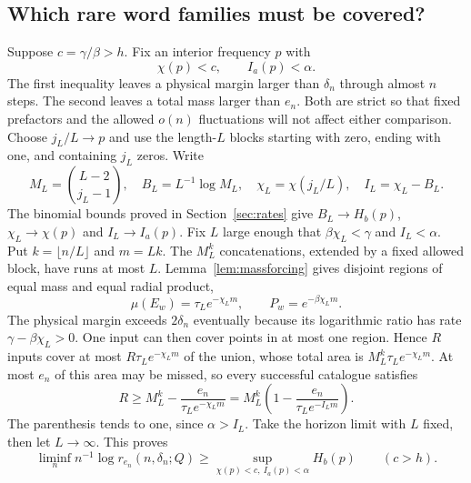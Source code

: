 \documentclass[11pt]{amsart}
\theoremstyle{definition}
\theoremstyle{remark}
\numberwithin{equation}{section}
\begin{document}
\subsection{Which rare word families must be covered?}
Suppose $c=\gamma/\beta>h$. Fix an interior frequency $p$ with
\begin{equation}\label{eq:strictprobtype}
\chi(p)<c,\qquad I_a(p)<\alpha.
\end{equation}
The first inequality leaves a physical margin larger than
$\delta_n$ through almost $n$ steps. The second leaves a total
mass larger than $e_n$. Both are strict so that fixed prefactors
and the allowed $o(n)$ fluctuations will not affect either comparison.
Choose $j_L/L\to p$ and use the length-$L$ blocks starting with
zero, ending with one, and containing $j_L$ zeros. Write
\[
M_L=\binom{L-2}{j_L-1},\quad B_L=L^{-1}\log M_L,
\quad\chi_L=\chi(j_L/L),\quad I_L=\chi_L-B_L.
\]
The binomial bounds proved in Section~\ref{sec:rates} give
$B_L\to H_b(p)$, $\chi_L\to\chi(p)$ and $I_L\to I_a(p)$.
Fix $L$ large enough that $\beta\chi_L<\gamma$ and $I_L<\alpha$.
Put $k=\lfloor n/L\rfloor$ and $m=Lk$.
The $M_L^k$ concatenations, extended by a fixed allowed block,
have runs at most $L$. Lemma~\ref{lem:massforcing} gives disjoint
regions of equal mass and equal radial product,
\[
\mu(E_w)=\tau_Le^{-\chi_Lm},\qquad P_w=e^{-\beta\chi_Lm}.
\]
The physical margin exceeds $2\delta_n$ eventually because its
logarithmic ratio has rate $\gamma-\beta\chi_L>0$.
One input can then cover points in at most one region. Hence $R$
inputs cover at most $R\tau_Le^{-\chi_Lm}$ of the union, whose
total area is $M_L^k\tau_Le^{-\chi_Lm}$. At most $e_n$ of this
area may be missed, so every successful catalogue satisfies
\begin{equation}\label{eq:rarecount}
R\ge M_L^k-\frac{e_n}{\tau_Le^{-\chi_Lm}}
 =M_L^k\left(1-\frac{e_n}{\tau_Le^{-I_Lm}}\right).
\end{equation}
The parenthesis tends to one, since $\alpha>I_L$.
Take the horizon limit with $L$ fixed, then let $L\to\infty$.
This proves
\begin{equation}\label{eq:strictlower}
\liminf_n n^{-1}\log r_{e_n}(n,\delta_n;Q)
 \ge\sup_{\chi(p)<c,\ I_a(p)<\alpha}H_b(p)\qquad(c>h).
\end{equation}
\end{document}
